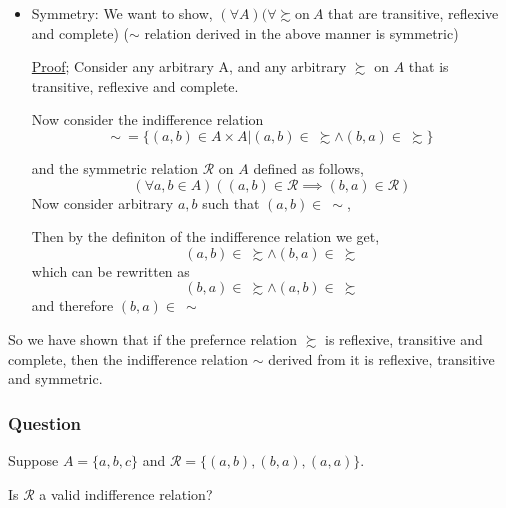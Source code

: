 \documentclass[12pt,a4paper]{article}
\begin{document}
\begin{itemize}
    \item Symmetry: We want to show,
    \(\left( \forall A  \right) (\forall \succsim  \text{on} \ A \)
    that are 
    transitive, reflexive and complete) (\(\sim \) relation derived in the above manner is symmetric)  
    \begin{tcolorbox}
      \underline{Proof}; Consider any arbitrary A, and any arbitrary \(\succsim \) on \(A\) that is transitive, reflexive and complete.
      
      Now consider the indifference relation 
      \begin{equation*}
          \sim \ = \{\left( a,b \right) \in A \times A | \left( a,b \right) \in \ \succsim \wedge \left( b,a \right) \in \ \succsim \}
      \end{equation*}

      and the symmetric relation \(\mathcal{R}\) on \(A\) defined as follows,
      \begin{equation*}
          \left( \forall a,b \in A  \right)\left( \left( a,b \right) \in \mathcal{R} \implies \left( b,a \right) \in \mathcal{R} \right)  
      \end{equation*}      
      Now consider arbitrary \(a,b\) such that \(\left( a,b \right) \in \ \sim  \),
      
      Then by the definiton of the indifference relation we get,
      \begin{equation*}
          \left( a,b \right) \in \ \succsim \wedge \left( b,a \right) \in \ \succsim
      \end{equation*}
      which can be rewritten as
      \begin{equation*}
        \left( b,a \right) \in \ \succsim \wedge \left( a,b \right) \in \ \succsim
    \end{equation*}
    and therefore \((b,a) \in \ \sim \)   
    \end{tcolorbox} 
  \end{itemize}
  So we have shown that if the prefernce relation \(\succsim \)  is reflexive, transitive and complete, then the indifference relation \(\sim \) derived from it is reflexive, transitive and symmetric.  
  
   \subsubsection*{Question} 
   Suppose \(A = \{a,b,c\} \) and \(\mathcal{R} = \{(a,b),(b,a),(a,a)\} \).

   Is \(\mathcal{R}\) a valid indifference relation?
   
\end{document}
